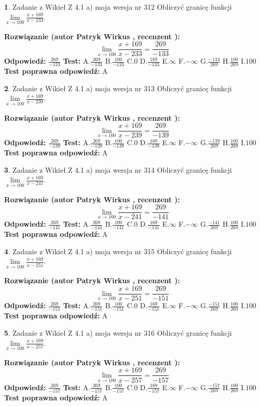 \documentclass[12pt, a4paper]{article}
\theoremstyle{definition} %
\newtheorem{zad}{}
\newcommand{\zadStart}[1]{\begin{zad}#1\newline}
\newcommand{\zadStop}{\end{zad}}
\newcommand{\rozwStart}[2]{\noindent \textbf{Rozwiązanie (autor #1 , recenzent #2): }\newline}
\newcommand{\rozwStop}{\newline}
\newcommand{\odpStart}{\noindent \textbf{Odpowiedź:}\newline}
\newcommand{\odpStop}{\newline}
\newcommand{\testStart}{\noindent \textbf{Test:}\newline}
\newcommand{\testStop}{\newline}
\newcommand{\kluczStart}{\noindent \textbf{Test poprawna odpowiedź:}\newline}
\newcommand{\kluczStop}{\newline}
\begin{document}
\zadStart{Zadanie z Wikieł Z 4.1 a) moja wersja nr 312}
Obliczyć granicę funkcji $\lim\limits_{x\to100}\frac{x+169}{x-233}$.
\zadStop
\rozwStart{Patryk Wirkus}{}
$$\lim\limits_{x\to100}\frac{x+169}{x-233} = \frac{269}{-133}$$
\rozwStop
\odpStart
$\frac{269}{-133}$
\odpStop
\testStart
A.$\frac{269}{-133}$
B.$\frac{100}{-133}$
C.$0$
D.$\frac{169}{-133}$
E.$\infty$
F.$-\infty$
G.$\frac{-133}{269}$
H.$\frac{100}{269}$
I.$100$
\testStop
\kluczStart
A
\kluczStop



\zadStart{Zadanie z Wikieł Z 4.1 a) moja wersja nr 313}
Obliczyć granicę funkcji $\lim\limits_{x\to100}\frac{x+169}{x-239}$.
\zadStop
\rozwStart{Patryk Wirkus}{}
$$\lim\limits_{x\to100}\frac{x+169}{x-239} = \frac{269}{-139}$$
\rozwStop
\odpStart
$\frac{269}{-139}$
\odpStop
\testStart
A.$\frac{269}{-139}$
B.$\frac{100}{-139}$
C.$0$
D.$\frac{169}{-139}$
E.$\infty$
F.$-\infty$
G.$\frac{-139}{269}$
H.$\frac{100}{269}$
I.$100$
\testStop
\kluczStart
A
\kluczStop



\zadStart{Zadanie z Wikieł Z 4.1 a) moja wersja nr 314}
Obliczyć granicę funkcji $\lim\limits_{x\to100}\frac{x+169}{x-241}$.
\zadStop
\rozwStart{Patryk Wirkus}{}
$$\lim\limits_{x\to100}\frac{x+169}{x-241} = \frac{269}{-141}$$
\rozwStop
\odpStart
$\frac{269}{-141}$
\odpStop
\testStart
A.$\frac{269}{-141}$
B.$\frac{100}{-141}$
C.$0$
D.$\frac{169}{-141}$
E.$\infty$
F.$-\infty$
G.$\frac{-141}{269}$
H.$\frac{100}{269}$
I.$100$
\testStop
\kluczStart
A
\kluczStop



\zadStart{Zadanie z Wikieł Z 4.1 a) moja wersja nr 315}
Obliczyć granicę funkcji $\lim\limits_{x\to100}\frac{x+169}{x-251}$.
\zadStop
\rozwStart{Patryk Wirkus}{}
$$\lim\limits_{x\to100}\frac{x+169}{x-251} = \frac{269}{-151}$$
\rozwStop
\odpStart
$\frac{269}{-151}$
\odpStop
\testStart
A.$\frac{269}{-151}$
B.$\frac{100}{-151}$
C.$0$
D.$\frac{169}{-151}$
E.$\infty$
F.$-\infty$
G.$\frac{-151}{269}$
H.$\frac{100}{269}$
I.$100$
\testStop
\kluczStart
A
\kluczStop



\zadStart{Zadanie z Wikieł Z 4.1 a) moja wersja nr 316}
Obliczyć granicę funkcji $\lim\limits_{x\to100}\frac{x+169}{x-257}$.
\zadStop
\rozwStart{Patryk Wirkus}{}
$$\lim\limits_{x\to100}\frac{x+169}{x-257} = \frac{269}{-157}$$
\rozwStop
\odpStart
$\frac{269}{-157}$
\odpStop
\testStart
A.$\frac{269}{-157}$
B.$\frac{100}{-157}$
C.$0$
D.$\frac{169}{-157}$
E.$\infty$
F.$-\infty$
G.$\frac{-157}{269}$
H.$\frac{100}{269}$
I.$100$
\testStop
\kluczStart
A
\kluczStop
\end{document}

